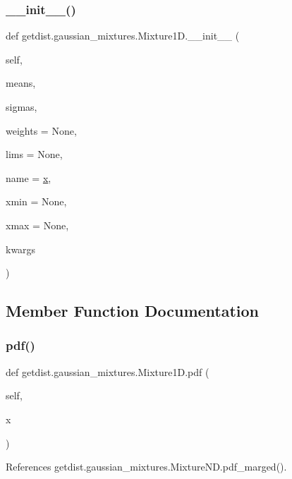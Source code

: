 \subsubsection{\texorpdfstring{\+\_\+\+\_\+init\+\_\+\+\_\+()}{\_\_init\_\_()}}
{\footnotesize\ttfamily def getdist.\+gaussian\+\_\+mixtures.\+Mixture1\+D.\+\_\+\+\_\+init\+\_\+\+\_\+ (\begin{DoxyParamCaption}\item[{}]{self,  }\item[{}]{means,  }\item[{}]{sigmas,  }\item[{}]{weights = {\ttfamily None},  }\item[{}]{lims = {\ttfamily None},  }\item[{}]{name = {\ttfamily \textquotesingle{}\mbox{\hyperlink{plotTT_8m_a9336ebf25087d91c818ee6e9ec29f8c1}{x}}\textquotesingle{}},  }\item[{}]{xmin = {\ttfamily None},  }\item[{}]{xmax = {\ttfamily None},  }\item[{}]{kwargs }\end{DoxyParamCaption})}



\subsection{Member Function Documentation}
\mbox{\label{classgetdist_1_1gaussian__mixtures_1_1Mixture1D_a23be258f48e4829421085cccbf568478}} 
\subsubsection{\texorpdfstring{pdf()}{pdf()}}
{\footnotesize\ttfamily def getdist.\+gaussian\+\_\+mixtures.\+Mixture1\+D.\+pdf (\begin{DoxyParamCaption}\item[{}]{self,  }\item[{}]{x }\end{DoxyParamCaption})}



References getdist.\+gaussian\+\_\+mixtures.\+Mixture\+N\+D.\+pdf\+\_\+marged().

